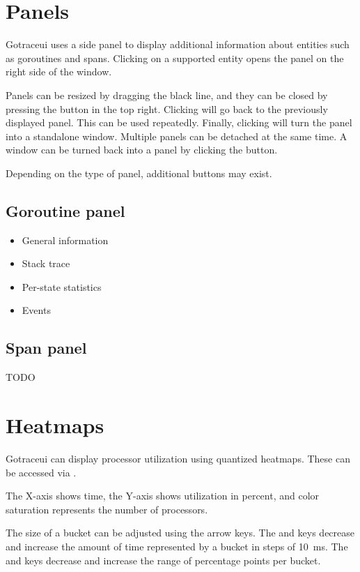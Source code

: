 \documentclass[10pt,letterpaper,oneside,openany,english]{memoir}
\newcommand{\todo}[1]{{\color{red}#1}}
\begin{document}
\section{Panels}\label{panels}

Gotraceui uses a side panel to display additional information about entities such as goroutines and spans.
Clicking on a supported entity opens the panel on the right side of the window.

Panels can be resized by dragging the black line, and they can be closed by pressing the  button in the top right.
Clicking  will go back to the previously displayed panel. This can be used repeatedly.
Finally, clicking  will turn the panel into a standalone window.
Multiple panels can be detached at the same time.
A window can be turned back into a panel by clicking the  button.

Depending on the type of panel, additional buttons may exist. 

\subsection{Goroutine panel}
\begin{itemize}
\item \todo{General information}
\item \todo{Stack trace}
\item \todo{Per-state statistics}
\item \todo{Events}
\end{itemize}

\subsection{Span panel}

\todo{TODO}

\section{Heatmaps}

Gotraceui can display processor utilization using quantized heatmaps.
These can be accessed via .

The X-axis shows time, the Y-axis shows utilization in percent, and color saturation represents the number of processors.

The size of a bucket can be adjusted using the arrow keys. The \keys{\arrowkey{<}} and \keys{\arrowkey{>}} keys decrease and increase the amount of time represented by a bucket in steps of \qty{10}{\milli\second}.
The  and \keys{\arrowkey{^}} keys decrease and increase the range of percentage points per bucket.
\end{document}
